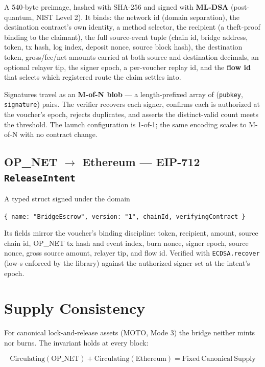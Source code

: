 \documentclass[11pt,a4paper]{article}
\begin{document}
A 540-byte preimage, hashed with SHA-256 and signed with \textbf{ML-DSA} (post-quantum, NIST Level 2). It binds: the network id (domain separation), the destination contract's own identity, a method selector, the recipient (a theft-proof binding to the claimant), the full source-event tuple (chain id, bridge address, token, tx hash, log index, deposit nonce, source block hash), the destination token, gross/fee/net amounts carried at both source and destination decimals, an optional relayer tip, the signer epoch, a per-voucher replay id, and the \textbf{flow id} that selects which registered route the claim settles into.

Signatures travel as an \textbf{M-of-N blob} --- a length-prefixed array of (\texttt{pubkey}, \texttt{signature}) pairs. The verifier recovers each signer, confirms each is authorized at the voucher's epoch, rejects duplicates, and asserts the distinct-valid count meets the threshold. The launch configuration is 1-of-1; the same encoding scales to M-of-N with no contract change.

\subsection{OP\_NET $\rightarrow$ Ethereum --- EIP-712 \texttt{ReleaseIntent}}

A typed struct signed under the domain
\begin{center}
\texttt{\{ name: "BridgeEscrow", version: "1", chainId, verifyingContract \}}
\end{center}
Its fields mirror the voucher's binding discipline: token, recipient, amount, source chain id, OP\_NET tx hash and event index, burn nonce, signer epoch, source nonce, gross source amount, relayer tip, and flow id. Verified with \texttt{ECDSA.recover} (low-s enforced by the library) against the authorized signer set at the intent's epoch.

\section{Supply Consistency}

For canonical lock-and-release assets (MOTO, Mode 3) the bridge neither mints nor burns. The invariant holds at every block:

\[
\mathrm{Circulating}(\mathrm{OP\_NET}) + \mathrm{Circulating}(\mathrm{Ethereum}) = \mathrm{Fixed\ Canonical\ Supply}
\]
\end{document}
